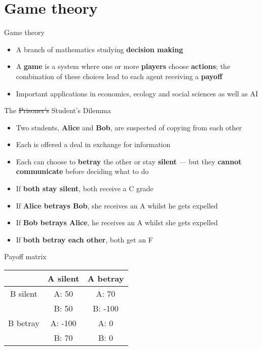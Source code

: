 \part{Game theory}
\frame{\partpage}

\begin{frame}{Game theory}
	\begin{itemize}
		\pause\item A branch of mathematics studying \textbf{decision making}
		\pause\item A \textbf{game} is a system where one or more \textbf{players} choose \textbf{actions};
			the combination of these choices lead to each agent receiving a \textbf{payoff}
		\pause\item Important applications in economics, ecology and social sciences as well as AI
	\end{itemize}
\end{frame}

\begin{frame}{The \sout{Prisoner's} Student's Dilemma}
	\begin{itemize}
		\pause\item Two students, \textbf{Alice} and \textbf{Bob}, are suspected of copying from each other
		\pause\item Each is offered a deal in exchange for information
		\pause\item Each can choose to \textbf{betray} the other or stay \textbf{silent}
			--- but they \textbf{cannot communicate} before deciding what to do
		\pause\item If \textbf{both stay silent}, both receive a C grade
		\pause\item If \textbf{Alice betrays Bob}, she receives an A whilst he gets expelled
		\pause\item If \textbf{Bob betrays Alice}, he receives an A whilst she gets expelled
		\pause\item If \textbf{both betray each other}, both get an F
	\end{itemize}
\end{frame}

\begin{frame}{Payoff matrix}
	\pause
	\begin{center}
		\begin{tabular}{|c|c|c|}
			\hline
			         & A silent & A betray \\\hline
			B silent & A: 50    & A: 70 \\
			         & B: 50    & B: -100 \\\hline
			B betray & A: -100  & A: 0 \\
			         & B: 70    & B: 0 \\\hline
		\end{tabular}
	\end{center}
\end{frame}

